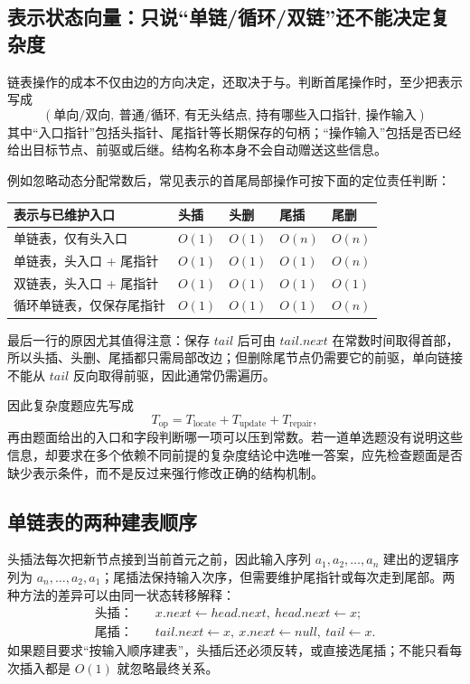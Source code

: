\documentclass[UTF8,fontset=none,11pt,a4paper]{ctexart}
\begin{document}
\subsection{表示状态向量：只说“单链/循环/双链”还不能决定复杂度}
链表操作的成本不仅由边的方向决定，还取决于与。判断首尾操作时，至少把表示写成
\[
\boxed{
(\text{单向/双向},\ \text{普通/循环},\ \text{有无头结点},\ \text{持有哪些入口指针},\ \text{操作输入})
}
\]
其中“入口指针”包括头指针、尾指针等长期保存的句柄；“操作输入”包括是否已经给出目标节点、前驱或后继。结构名称本身不会自动赠送这些信息。

例如忽略动态分配常数后，常见表示的首尾局部操作可按下面的定位责任判断：
\begin{center}\small
\begin{tabularx}{\linewidth}{L{3.2cm}C{1.5cm}C{1.5cm}C{1.5cm}C{1.5cm}}
\toprule
表示与已维护入口 & 头插 & 头删 & 尾插 & 尾删\\
\midrule
单链表，仅有头入口 & $O(1)$ & $O(1)$ & $O(n)$ & $O(n)$\\
单链表，头入口 + 尾指针 & $O(1)$ & $O(1)$ & $O(1)$ & $O(n)$\\
双链表，头入口 + 尾指针 & $O(1)$ & $O(1)$ & $O(1)$ & $O(1)$\\
循环单链表，仅保存尾指针 & $O(1)$ & $O(1)$ & $O(1)$ & $O(n)$\\
\bottomrule
\end{tabularx}\end{center}

最后一行的原因尤其值得注意：保存 $tail$ 后可由 $tail.next$ 在常数时间取得首部，所以头插、头删、尾插都只需局部改边；但删除尾节点仍需要它的前驱，单向链接不能从 $tail$ 反向取得前驱，因此通常仍需遍历。

因此复杂度题应先写成
\[
T_{\text{op}}=T_{\text{locate}}+T_{\text{update}}+T_{\text{repair}},
\]
再由题面给出的入口和字段判断哪一项可以压到常数。若一道单选题没有说明这些信息，却要求在多个依赖不同前提的复杂度结论中选唯一答案，应先检查题面是否缺少表示条件，而不是反过来强行修改正确的结构机制。

\subsection{单链表的两种建表顺序}
头插法每次把新节点接到当前首元之前，因此输入序列 $a_1,a_2,\ldots,a_n$ 建出的逻辑序列为 $a_n,\ldots,a_2,a_1$；尾插法保持输入次序，但需要维护尾指针或每次走到尾部。两种方法的差异可以由同一状态转移解释：
\[
\begin{aligned}
\text{头插：}&\quad x.next\leftarrow head.next,\ head.next\leftarrow x;\\
\text{尾插：}&\quad tail.next\leftarrow x,\ x.next\leftarrow null,\ tail\leftarrow x.
\end{aligned}
\]
如果题目要求“按输入顺序建表”，头插后还必须反转，或直接选尾插；不能只看每次插入都是 $O(1)$ 就忽略最终关系。
\end{document}
